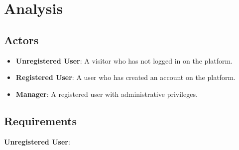 \chapter{Analysis}

\section {Actors}
\begin{itemize}
    \item \textbf{Unregistered User}: A visitor who has not logged in on the platform.
    \item \textbf{Registered User}: A user who has created an account on the platform. 
    \item \textbf{Manager}: A registered user with administrative privileges. 
\end{itemize}

\section{Requirements}
\textbf{Unregistered User}:

